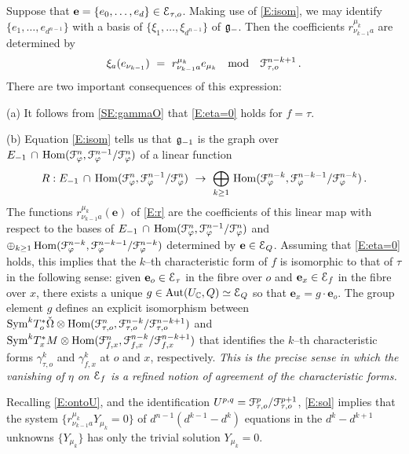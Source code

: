 \documentclass[12pt]{amsart}
\numberwithin{equation}{section}
\numberwithin{table}{section}
\numberwithin{figure}{section}
\begin{document}
\begin{remark} \label{R:eta=0}
Suppose that $\mathbf{e} = \{ e_0 , \ldots , e_d \} \in \mathcal E_{\tau,o}$.  Making use of \eqref{E:isom}, we may identify $\{e_1,\ldots,e_{d^{n-1}}\}$ with a basis of $\{\xi_1 , \ldots , \xi_{d^{n-1}}\}$ of ${\mathfrak{g}}_{-}$.  Then the coefficients $r^{\mu_k}_{\nu_{k-1}a}$ are determined by 
\begin{equation} \label{E:sol}
  \xi_a(e_{\nu_{k-1}}) \ = \ r^{\mu_k}_{\nu_{k-1}a} e_{\mu_k} 
  \quad\hbox{mod}\quad \mathcal F^{n-k+1}_{\tau,o} \,.
\end{equation}
There are two important consequences of this expression:

(a) It follows from \eqref{SE:gammaO} that \eqref{E:eta=0} holds for $f = \tau$.

(b) Equation \eqref{E:isom} tells us that ${\mathfrak{g}}_{-1}$ is the graph over $E_{-1} \,\cap\,\mathrm{Hom}(\mathcal F^{n}_\varphi , \mathcal F^{n-1}_\varphi/\mathcal F^{n}_\varphi)$ of a linear function
\[
  R : E_{-1} \,\cap\,\mathrm{Hom}(\mathcal F^{n}_\varphi , \mathcal F^{n-1}_\varphi/\mathcal F^{n}_\varphi)
  \ \to \ \bigoplus_{k\ge1} \,  
  \mathrm{Hom}(\mathcal F^{n-k}_\varphi , \mathcal F^{n-k-1}_\varphi/\mathcal F^{n-k}_\varphi) \,.
\]
The functions $r^{\mu_k}_{\nu_{k-1}a}(\mathbf{e})$ of \eqref{E:r} are the coefficients of this linear map with respect to the bases of $E_{-1} \,\cap\,\mathrm{Hom}(\mathcal F^{n}_\varphi , \mathcal F^{n-1}_\varphi/\mathcal F^{n}_\varphi)$ and $\oplus_{k\ge1}\, \mathrm{Hom}(\mathcal F^{n-k}_\varphi , \mathcal F^{n-k-1}_\varphi/\mathcal F^{n-k}_\varphi)$ determined by $\mathbf{e} \in \mathcal E_Q$.  Assuming that \eqref{E:eta=0} holds, this implies that the $k$--th characteristic form of $f$ is isomorphic to that of $\tau$ in the following sense: given $\mathbf{e}_o \in \mathcal E_\tau$ in the fibre over $o$ and $\mathbf{e}_x \in \mathcal E_f$ in the fibre over $x$, there exists a unique $g \in \mathrm{Aut}(U_\mathbb C,Q) \simeq \mathcal E_Q$ so that $\mathbf{e}_x = g \cdot \mathbf{e}_o$.  The group element $g$ defines an explicit isomorphism between $\mathrm{Sym}^k T^*_o\check\Omega \otimes \mathrm{Hom}(\mathcal F^n_{\tau,o} , \mathcal F^{n-k}_{\tau,o}/\mathcal F^{n-k+1}_{\tau,o})$ and $\mathrm{Sym}^k T^*_x M \otimes \mathrm{Hom}(\mathcal F^n_{f,x} , \mathcal F^{n-k}_{f,x}/\mathcal F^{n-k+1}_{f,x})$ that identifies the $k$--th characteristic forms $\gamma^k_{\tau,o}$ and $\gamma^k_{f,x}$ at $o$ and $x$, respectively.  \emph{This is the precise sense in which the vanishing of $\eta$ on $\mathcal E_f$ is a refined notion of agreement of the characteristic forms.}
\end{remark}

\begin{remark}\label{R:sol}
Recalling \eqref{E:ontoU}, and the identification $U^{p,q} = \mathcal F^p_{\tau,o}/\mathcal F^{p+1}_{\tau,o}$, \eqref{E:sol} implies that the system $\{r^{\mu_k}_{\nu_{k-1}a} Y_{\mu_k} = 0\}$ of $d^{n-1}(d^{k-1}-d^k)$ equations in the $d^{k}-d^{k+1}$ unknowns $\{Y_{\mu_k}\}$ has only the trivial solution $Y_{\mu_k}=0$.
\end{remark}
\end{document}
